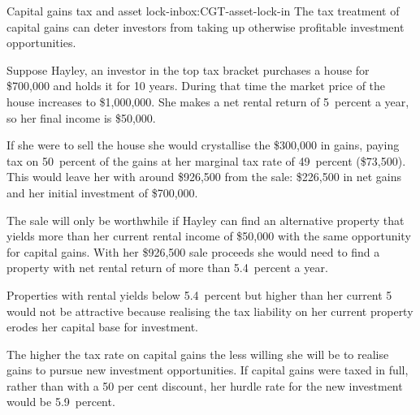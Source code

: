 \documentclass[continuous]{grattan}
\begin{document}
\begin{smallbox}[!hp]{Capital gains tax and asset lock-in}{box:CGT-asset-lock-in}
The tax treatment of capital gains can deter investors from taking up otherwise profitable investment opportunities. 



Suppose Hayley, an investor in the top tax bracket purchases a house for \$700,000 and holds it for 10 years. During that time the market price of the house increases to \$1,000,000. She makes a net rental return of 5~percent a year, so her  final income is \$50,000. 

If she were to sell the house she would crystallise the \$300,000 in gains, paying tax on 50~percent of the gains at her marginal tax rate of 49~percent (\$73,500). This would leave her with around \$926,500 from the sale: \$226,500 in net gains and her initial investment of \$700,000. 

The sale will only be worthwhile if Hayley can find an alternative property that yields more than her current rental income of \$50,000  with the same opportunity for capital gains. With her \$926,500 sale proceeds she would need to find a property with net rental return of more than 5.4~percent a year. 

Properties with rental yields below 5.4~percent but higher than her current 5 would not be attractive because realising the tax liability on her current property erodes her capital base for investment.  

The higher the tax rate on capital gains the less willing she will be to realise gains to pursue new investment opportunities. If capital gains were taxed in full, rather than with a 50 per cent discount, her hurdle rate for the new investment would be 5.9~percent.
\end{smallbox}
\end{document}
